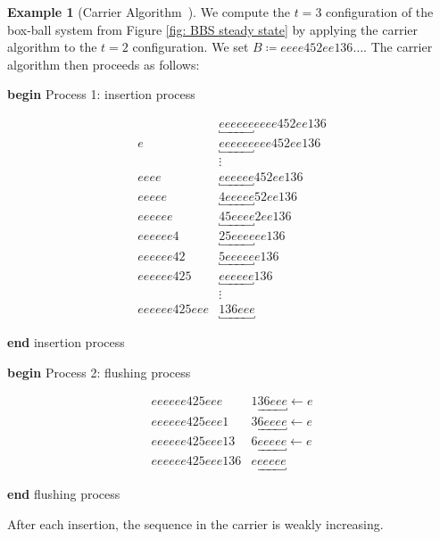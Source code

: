 \documentclass[submission]{FPSAC2021}
\theoremstyle{plain}
\theoremstyle{definition}
\newtheorem{example}[theorem]{Example}
\numberwithin{equation}{section}
\begin{document}
\begin{example}[Carrier Algorithm~\cite{fukuda04}] 
We compute the $t=3$ configuration of the box-ball system from Figure \ref{fig: BBS steady state} by applying the carrier algorithm to the $t=2$ configuration. We set $B\coloneqq eeee452ee136\dots$. 
The carrier algorithm then proceeds as follows:
    \begin{multicols}{2}
    \begin{minipage}[H]{0.45\textwidth}
            \begin{center}
            \textbf{begin} Process 1: insertion process
            \vspace{-1em}
            \end{center}
            \begin{align*}
        &\underbracket{eeeeee}eeee452ee136\\
        e&\underbracket{eeeeee}eee452ee136\\
        &\vdots\\%
        eeee&\underbracket{eeeeee}452ee136\\
        eeeee&\underbracket{4eeeee}52ee136\\
        eeeeee&\underbracket{45eeee}2ee136\\%
        eeeeee4&\underbracket{25eeee}ee136\\
        eeeeee42&\underbracket{5eeeee}e136\\
        eeeeee425&\underbracket{eeeeee}136\\
        &\vdots\\%
        eeeeee425eee&\underbracket{136eee}
        \end{align*}
        \begin{center}
            \textbf{end} insertion process
            \end{center}
            \end{minipage}
            \begin{minipage}[H]{0.45\textwidth}
            \begin{center}
            \textbf{begin} Process 2: flushing process
            \vspace{-1em}
            \end{center}
        \begin{align*}
        eeeeee425eee&\underbracket{136eee}\leftarrow e\\
        eeeeee425eee1&\underbracket{36eeee}\leftarrow e\\
        eeeeee425eee13&\underbracket{6eeeee}\leftarrow e\\
        eeeeee425eee136&\underbracket{eeeeee}
        \end{align*}
        \begin{center}
            \textbf{end} flushing process
        \end{center}
        \end{minipage}
\end{multicols}
After each insertion, the sequence in the carrier is weakly increasing.
\end{example}
\end{document}
